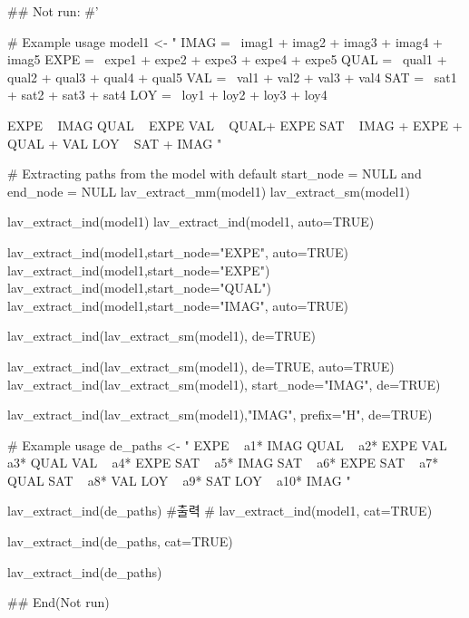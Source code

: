 \documentclass[a4paper]{book}
\begin{document}
\begin{Examples}
\begin{ExampleCode}


\#\# Not run: 
#'

# Example usage
model1 <- "
IMAG =~ imag1 + imag2 + imag3 + imag4 + imag5
EXPE =~ expe1 + expe2 + expe3 + expe4 + expe5
QUAL =~ qual1 + qual2 + qual3 + qual4 + qual5
VAL =~ val1 + val2 + val3 + val4
SAT =~ sat1 + sat2 + sat3 + sat4
LOY =~ loy1 + loy2 + loy3 + loy4

EXPE ~ IMAG
QUAL ~ EXPE
VAL ~  QUAL+ EXPE
SAT ~ IMAG + EXPE + QUAL + VAL
LOY ~ SAT + IMAG
"


# Extracting paths from the model with default start_node = NULL and end_node = NULL
lav_extract_mm(model1) %
lav_extract_sm(model1) %

lav_extract_ind(model1)%
lav_extract_ind(model1, auto=TRUE)%

lav_extract_ind(model1,start_node="EXPE", auto=TRUE)%
lav_extract_ind(model1,start_node="EXPE")%
lav_extract_ind(model1,start_node="QUAL")%
lav_extract_ind(model1,start_node="IMAG", auto=TRUE)%

lav_extract_ind(lav_extract_sm(model1), de=TRUE) %

lav_extract_ind(lav_extract_sm(model1), de=TRUE, auto=TRUE)%
lav_extract_ind(lav_extract_sm(model1), start_node="IMAG", de=TRUE) %

lav_extract_ind(lav_extract_sm(model1),"IMAG", prefix="H", de=TRUE) %

# Example usage
de_paths <- "
EXPE  ~ a1* IMAG
QUAL  ~ a2* EXPE
VAL  ~ a3* QUAL
VAL  ~ a4* EXPE
SAT  ~ a5* IMAG
SAT  ~ a6* EXPE
SAT  ~ a7* QUAL
SAT  ~ a8* VAL
LOY  ~ a9* SAT
LOY  ~ a10* IMAG
"

lav_extract_ind(de_paths)
#출력
#  lav_extract_ind(model1, cat=TRUE)

lav_extract_ind(de_paths, cat=TRUE)

lav_extract_ind(de_paths)%

## End(Not run)

\end{ExampleCode}
\end{Examples}
\end{document}
